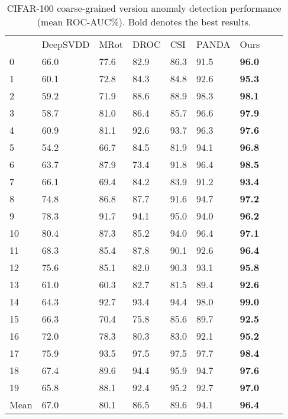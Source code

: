 \documentclass[letterpaper]{article} \usepackage{aaai23}  \usepackage{times}  \usepackage{helvet}  \usepackage{courier}  \usepackage[hyphens]{url}  \usepackage{graphicx} \usepackage{amsmath, amssymb}
\begin{document}
\begin{table*}[ht]
  \centering
  \begin{tabular}{lllllllll}
    \toprule
&	DeepSVDD &	MRot 	&	DROC &	CSI 	&	PANDA	&	Ours	\\

    \cmidrule(r){1-1}
    \cmidrule(r){2-7}

0	&	66.0	&	77.6	&	82.9	&	86.3	&	91.5	&	\textbf{96.0}	\\
1	&	60.1	&	72.8	&	84.3	&	84.8	&	92.6	&	\textbf{95.3}	\\
2	&	59.2	&	71.9	&	88.6	&	88.9	&	98.3	&	\textbf{98.1}	\\
3	&	58.7	&	81.0	&	86.4	&	85.7	&	96.6	&	\textbf{97.9}	\\
4	&	60.9	&	81.1	&	92.6	&	93.7	&	96.3	&	\textbf{97.6}	\\
5	&	54.2	&	66.7	&	84.5	&	81.9	&	94.1	&	\textbf{96.8}	\\
6	&	63.7	&	87.9	&	73.4	&	91.8	&	96.4	&	\textbf{98.5}	\\
7	&	66.1	&	69.4	&	84.2	&	83.9	&	91.2	&	\textbf{93.4}	\\
8	&	74.8	&	86.8	&	87.7	&	91.6	&	94.7	&	\textbf{97.2}	\\
9	&	78.3	&	91.7	&	94.1	&	95.0	&	94.0	&	\textbf{96.2}	\\
10	&	80.4	&	87.3	&	85.2	&	94.0	&	96.4	&	\textbf{97.1}	\\
11	&	68.3	&	85.4	&	87.8	&	90.1	&	92.6	&	\textbf{96.4}	\\
12	&	75.6	&	85.1	&	82.0	&	90.3	&	93.1	&	\textbf{95.8}	\\
13	&	61.0	&	60.3	&	82.7	&	81.5	&	89.4	&	\textbf{92.6}	\\
14	&	64.3	&	92.7	&	93.4	&	94.4	&	98.0	&	\textbf{99.0}	\\
15	&	66.3	&	70.4	&	75.8	&	85.6	&	89.7	&	\textbf{92.5}	\\
16	&	72.0	&	78.3	&	80.3	&	83.0	&	92.1	&	\textbf{95.2}	\\
17	&	75.9	&	93.5	&	97.5	&	97.5	&	97.7	&	\textbf{98.4}	\\
18	&	67.4	&	89.6	&	94.4	&	95.9	&	94.7	&	\textbf{97.6}	\\
19	&	65.8	&	88.1	&	92.4	&	95.2	&	92.7	&	\textbf{97.0}	\\
						
    \cmidrule(r){1-1}
    \cmidrule(r){2-7}

Mean	&	67.0	&	80.1	&	86.5	&	89.6	&	94.1	&	\textbf{96.4}	\\	

    \bottomrule
  \end{tabular}
\caption{CIFAR-100 coarse-grained version anomaly detection performance (mean ROC-AUC\%). Bold denotes the best results.}
\label{tab:cifar-100}
\end{table*}
\end{document}
